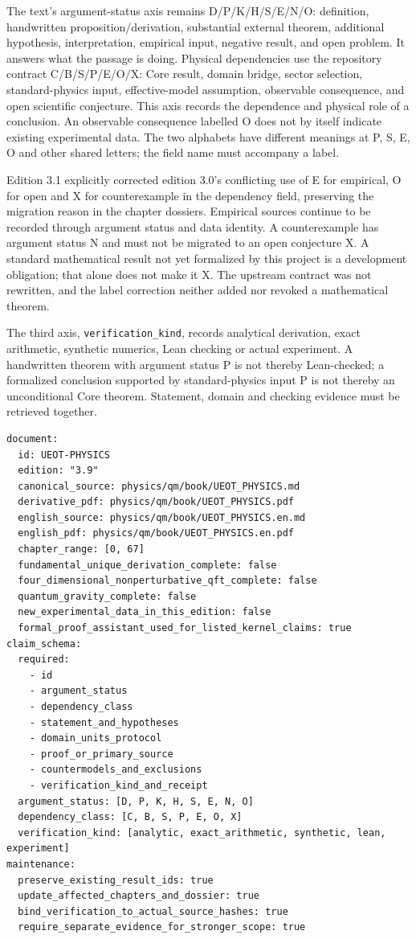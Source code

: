 \documentclass[
  11pt,
  oneside]{book}
\begin{document}
The text's argument-status axis remains D/P/K/H/S/E/N/O: definition,
handwritten proposition/derivation, substantial external theorem,
additional hypothesis, interpretation, empirical input, negative result,
and open problem. It answers what the passage is doing. Physical
dependencies use the repository contract C/B/S/P/E/O/X: Core result,
domain bridge, sector selection, standard-physics input, effective-model
assumption, observable consequence, and open scientific conjecture. This
axis records the dependence and physical role of a conclusion. An
observable consequence labelled O does not by itself indicate existing
experimental data. The two alphabets have different meanings at P, S, E,
O and other shared letters; the field name must accompany a label.

Edition 3.1 explicitly corrected edition 3.0's conflicting use of E for
empirical, O for open and X for counterexample in the dependency field,
preserving the migration reason in the chapter dossiers. Empirical
sources continue to be recorded through argument status and data
identity. A counterexample has argument status N and must not be
migrated to an open conjecture X. A standard mathematical result not yet
formalized by this project is a development obligation; that alone does
not make it X. The upstream contract was not rewritten, and the label
correction neither added nor revoked a mathematical theorem.

The third axis, \texttt{verification\_\allowbreak kind}, records analytical
derivation, exact arithmetic, synthetic numerics, Lean checking or
actual experiment. A handwritten theorem with argument status P is not
thereby Lean-checked; a formalized conclusion supported by
standard-physics input P is not thereby an unconditional Core theorem.
Statement, domain and checking evidence must be retrieved together.

\begin{Verbatim}[breaklines,breakanywhere,fontsize=\scriptsize]
document:
  id: UEOT-PHYSICS
  edition: "3.9"
  canonical_source: physics/qm/book/UEOT_PHYSICS.md
  derivative_pdf: physics/qm/book/UEOT_PHYSICS.pdf
  english_source: physics/qm/book/UEOT_PHYSICS.en.md
  english_pdf: physics/qm/book/UEOT_PHYSICS.en.pdf
  chapter_range: [0, 67]
  fundamental_unique_derivation_complete: false
  four_dimensional_nonperturbative_qft_complete: false
  quantum_gravity_complete: false
  new_experimental_data_in_this_edition: false
  formal_proof_assistant_used_for_listed_kernel_claims: true
claim_schema:
  required:
    - id
    - argument_status
    - dependency_class
    - statement_and_hypotheses
    - domain_units_protocol
    - proof_or_primary_source
    - countermodels_and_exclusions
    - verification_kind_and_receipt
  argument_status: [D, P, K, H, S, E, N, O]
  dependency_class: [C, B, S, P, E, O, X]
  verification_kind: [analytic, exact_arithmetic, synthetic, lean, experiment]
maintenance:
  preserve_existing_result_ids: true
  update_affected_chapters_and_dossier: true
  bind_verification_to_actual_source_hashes: true
  require_separate_evidence_for_stronger_scope: true
\end{Verbatim}
\end{document}

